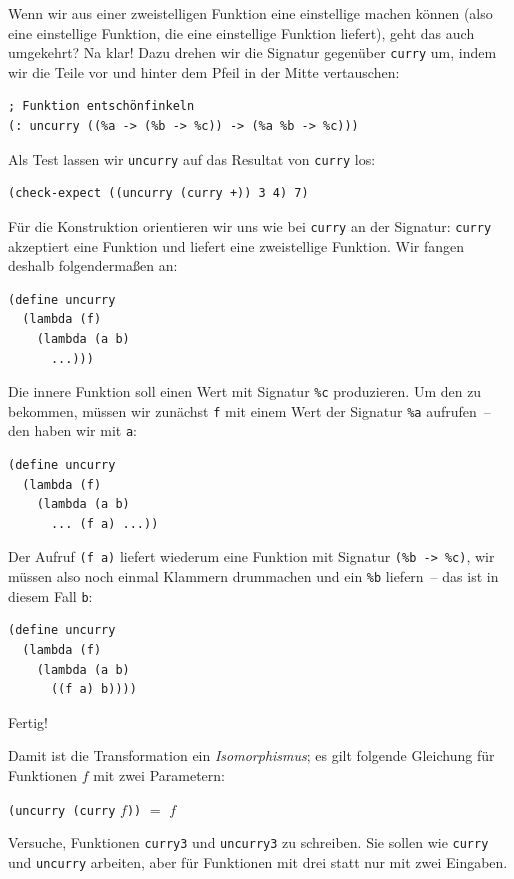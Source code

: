 Wenn wir aus einer zweistelligen Funktion eine einstellige machen
können (also eine einstellige Funktion, die eine einstellige Funktion
liefert), geht das auch umgekehrt?  Na klar!  Dazu drehen wir die
Signatur gegenüber \lstinline{curry} um, indem wir die Teile vor und
hinter dem Pfeil in der Mitte vertauschen:
%
\begin{lstlisting}
; Funktion entschönfinkeln
(: uncurry ((%a -> (%b -> %c)) -> (%a %b -> %c)))
\end{lstlisting}
%
Als Test lassen wir \lstinline{uncurry} auf das Resultat von
\lstinline{curry} los:
\begin{lstlisting}
(check-expect ((uncurry (curry +)) 3 4) 7)
\end{lstlisting}
%
Für die Konstruktion orientieren wir uns wie bei \lstinline{curry} an
der Signatur: \lstinline{curry} akzeptiert eine Funktion und liefert
eine zweistellige Funktion.  Wir fangen deshalb folgendermaßen an:
%
\begin{lstlisting}
(define uncurry
  (lambda (f)
    (lambda (a b)
      ...)))
\end{lstlisting}
%
Die innere Funktion soll einen Wert mit Signatur \lstinline{%c}
produzieren.  Um den zu bekommen, müssen wir zunächst \lstinline{f}
mit einem Wert der Signatur \lstinline{%a} aufrufen~-- den haben wir
mit \lstinline{a}:
%
\begin{lstlisting}
(define uncurry
  (lambda (f)
    (lambda (a b)
      ... (f a) ...))
\end{lstlisting}
%
Der Aufruf \lstinline{(f a)} liefert wiederum eine Funktion mit
Signatur \lstinline{(%b -> %c)}, wir müssen also noch einmal Klammern
drummachen und ein \lstinline{%b} liefern~-- das ist in diesem Fall
\lstinline{b}:
%
\begin{lstlisting}
(define uncurry
  (lambda (f)
    (lambda (a b)
      ((f a) b))))
\end{lstlisting}
%
Fertig!

Damit ist die Transformation ein \textit{Isomorphismus}; es gilt
folgende Gleichung für Funktionen $f$ mit zwei Parametern:
%
\begin{center}
  \lstinline{(uncurry (curry} \(f\)\lstinline{))} \(=\) \(f\)
\end{center}

\begin{aufgabeinline}
  Versuche, Funktionen \lstinline{curry3} und \lstinline{uncurry3} zu
  schreiben.  Sie sollen wie \lstinline{curry} und \lstinline{uncurry}
  arbeiten, aber für Funktionen mit drei statt nur mit zwei Eingaben.
\end{aufgabeinline}

